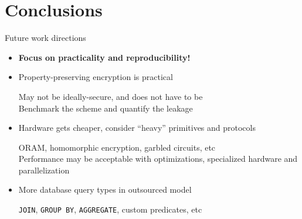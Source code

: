 \section{Conclusions}

	\begin{frame}{Future work directions}

		\begin{itemize}
			\item<1->
				\textbf{Focus on practicality and reproducibility!}

			\item<2->
				Property-preserving encryption is practical \cite{ore-benchmark-17} \\
				\begin{small}
					\indent{} May not be ideally-secure, and does not have to be \\
					\indent{} Benchmark the scheme and quantify the leakage
				\end{small}

			\item<3->
				Hardware gets cheaper, consider ``heavy'' primitives and protocols \cite{epsolute} \\
				\begin{small}
					\indent{} ORAM, homomorphic encryption, garbled circuits, etc \\
					\indent{} Performance may be acceptable with optimizations, specialized hardware and parallelization
				\end{small}

			\item<4->
				More database query types in outsourced model \\
				\begin{small}
					\indent{} \texttt{JOIN}, \texttt{GROUP BY}, \texttt{AGGREGATE}, custom predicates, etc
				\end{small}

		\end{itemize}

	\end{frame}
